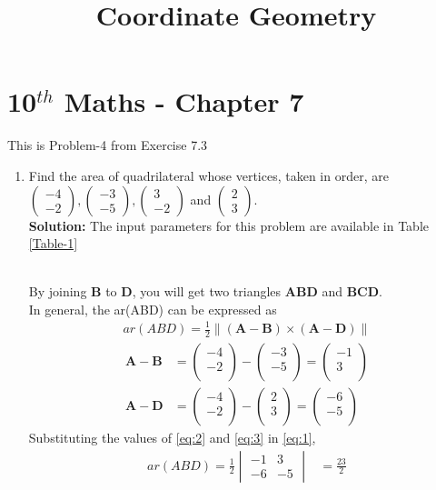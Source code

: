 \documentclass[12pt]{article}
\newcommand{\mydet}[1]{\ensuremath{\begin{vmatrix}#1\end{vmatrix}}}
\providecommand{\brak}[1]{\ensuremath{\left(#1\right)}}
\providecommand{\norm}[1]{\left\lVert#1\right\rVert}
\newcommand{\solution}{\noindent \textbf{Solution: }}
\newcommand{\myvec}[1]{\ensuremath{\begin{pmatrix}#1\end{pmatrix}}}
\let\vec\mathbf
\begin{document}
\begin{center}
\title{\textbf{Coordinate Geometry}}
\date{\vspace{-5ex}} %
\maketitle
\end{center}
\setcounter{page}{1}
\section*{10$^{th}$ Maths - Chapter 7}
This is Problem-4 from Exercise 7.3
\begin{enumerate}
\item Find the area of quadrilateral whose vertices, taken in order, are $\myvec{-4 \\ -2}, \myvec{-3\\-5}, \myvec{3\\-2}$ and $\myvec{2\\3}$.\\
	\solution The input parameters for this problem are available in Table \eqref{Table-1}
\begin{table}[ht!]\centering

\caption{}
\label{Table-1}	
\end{table}
\\By joining $\vec{B}$ to $\vec{D}$, you will get two triangles $\vec{A}\vec{B}\vec{D}$ and $\vec{B}\vec{C}\vec{D}$.\\
		In general, the ar(ABD) can be expressed as
  \begin{align}
	  ar(ABD)=\frac{1}{2} \norm{\brak{\vec{A}-\vec{B}}  \times 
   \brak{\vec{A}- \vec{D}}} \label{eq:1} 
\end{align}
\begin{align}
	\vec{A}- \vec{B} &= \myvec{-4\\-2\\}-\myvec{-3\\-5\\}=\myvec{-1\\3\\}\label{eq:2}\\
	  \vec{A}- \vec{D} &= \myvec{-4\\-2\\}-\myvec{2\\3\\}=\myvec{-6\\-5\\}\label{eq:3}
  \end{align}
Substituting the values of \eqref{eq:2} and \eqref{eq:3} in \eqref{eq:1},
\begin{align}
	ar(ABD)=\frac{1}{2}\mydet{-1 & 3\\-6 & -5}  
	&=	\frac{23}{2}
\end{align}


\end{enumerate}
\end{document}
